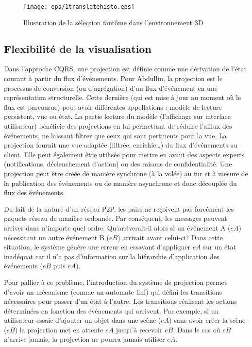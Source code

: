 \begin{figure}[ht]
	\centering
	\texttt{[image: eps/1translatehisto.eps]}
	\caption{Illustration de la sélection fantôme dans l'environnement 3D}
	\label{fig:ghostselection}
\end{figure}


\subsection{Flexibilité de la visualisation}
\label{sec:flexviz}
Dans l'approche \gls{CQRS}, une projection est définie comme une dérivation de l'état courant à 
partir du flux d'événements. Pour Abdullin, \og la projection est le processus de 
conversion (ou d'agrégation) d'un flux d'événement en une représentation 
structurelle. Cette dernière (qui est mise à jour au moment où le flux est parcourue) 
peut avoir différentes appellations : modèle de lecture persistent, vue ou 
état\fg{}\cite{Abdullin2011}.
La partie lecture du modèle (l'affichage sur interface utilisateur) bénéficie des 
projections en lui permettant de réduire l'afflux des événements, ne laissant filtrer 
que ceux qui sont pertinents pour la vue. La projection fournit une vue adaptée 
(filtrée, enrichie\ldots) du flux d'événements au client. Elle peut également être 
utilisée pour mettre en avant des aspects experts (notifications, déclenchement 
d'action) ou des raisons de confidentialité.
Une projection peut être créée de manière synchrone (à la volée) au fur et à 
mesure de la publication des événements ou de manière asynchrone et donc 
découplée du flux des événements. 


Du fait de la nature d'un réseau \gls{P2P}, les pairs ne reçoivent pas forcément les 
paquets réseau de manière ordonnée.
Par conséquent, les messages peuvent arriver dans n'importe quel ordre.
Qu'arriverait-il alors si un événement A ($eA$) nécessitant un autre événement B ($eB$) arrivait avant celui-ci? Dans cette situation, le système génére une 
erreur en essayant d'appliquer $eA$ sur un état inadéquat car il n'a pas 
d'information sur la hiérarchie d'application des événements ($eB$ puis $eA$).

Pour pallier à ce problème, l'introduction du système de projection permet d'avoir un 
mécanisme (comme un automate fini) qui défini les transitions nécessaires pour 
passer d'un état à l'autre. Les transitions réalisent les actions déterminées en fonction des 
événements qui arrivent. Par exemple, si un utilisateur essaie d'ajouter un objet dans une 
scène  ($eA$) sans avoir créer la scène ($eB$) la projection met en attente $eA$ 
jusqu'à recevoir $eB$. Dans le cas où $eB$ n'arrive jamais, la projection ne pourra 
jamais utiliser $eA$.


